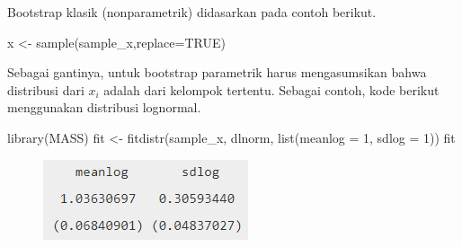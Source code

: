 \documentclass[
]{book}
\newenvironment{Shaded}{\begin{snugshade}}{\end{snugshade}}
\newcommand{\AttributeTok}[1]{\textcolor[rgb]{0.77,0.63,0.00}{#1}}
\newcommand{\ConstantTok}[1]{\textcolor[rgb]{0.00,0.00,0.00}{#1}}
\newcommand{\DecValTok}[1]{\textcolor[rgb]{0.00,0.00,0.81}{#1}}
\newcommand{\FunctionTok}[1]{\textcolor[rgb]{0.00,0.00,0.00}{#1}}
\newcommand{\NormalTok}[1]{#1}
\newcommand{\OtherTok}[1]{\textcolor[rgb]{0.56,0.35,0.01}{#1}}
\newcommand{\SpecialCharTok}[1]{\textcolor[rgb]{0.00,0.00,0.00}{#1}}
\begin{document}
Bootstrap klasik (nonparametrik) didasarkan pada contoh berikut.

\begin{Shaded}
\begin{Highlighting}[]
\NormalTok{x }\OtherTok{\textless{}{-}} \FunctionTok{sample}\NormalTok{(sample\_x,}\AttributeTok{replace=}\ConstantTok{TRUE}\NormalTok{)}
\end{Highlighting}
\end{Shaded}

Sebagai gantinya, untuk bootstrap parametrik harus mengasumsikan bahwa distribusi dari \(x_i\) adalah dari kelompok tertentu. Sebagai contoh, kode berikut menggunakan distribusi lognormal.

\begin{Shaded}
\begin{Highlighting}[]
\FunctionTok{library}\NormalTok{(MASS)}
\NormalTok{fit }\OtherTok{\textless{}{-}} \FunctionTok{fitdistr}\NormalTok{(sample\_x, dlnorm, }\FunctionTok{list}\NormalTok{(}\AttributeTok{meanlog =} \DecValTok{1}\NormalTok{, }\AttributeTok{sdlog =} \DecValTok{1}\NormalTok{))}
\NormalTok{fit}
\end{Highlighting}
\end{Shaded}

\begin{figure}

{\centering \includegraphics[width=1\linewidth]{images/6.2.4-1} 

}

\end{figure}

\begin{Shaded}
\end{Shaded}
\end{document}
